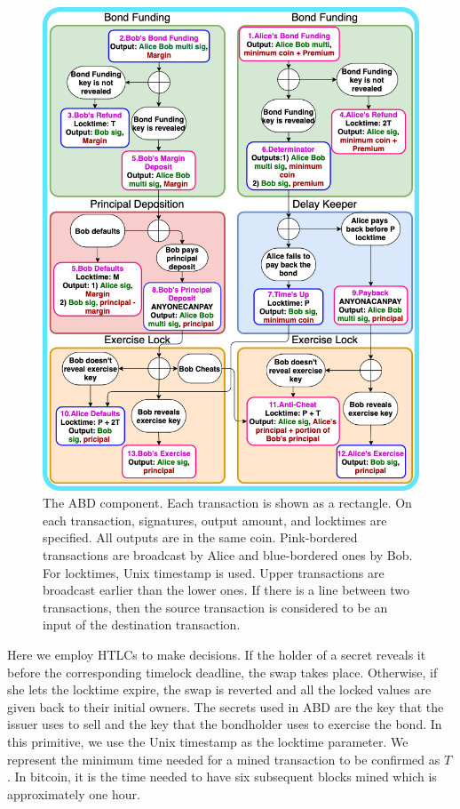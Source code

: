 \begin{figure}[h]
  \centering
  \includegraphics[width=\linewidth]{figures/bond-first.png}
  \caption{The ABD component. Each transaction is shown as a rectangle. On each transaction, signatures, output amount, and locktimes are specified. All outputs are in the same coin. Pink-bordered transactions are broadcast by Alice and blue-bordered ones by Bob. For locktimes, Unix timestamp is used. Upper transactions are broadcast earlier than the lower ones. If there is a line between two transactions, then the source transaction is considered to be an input of the destination transaction.}
  \label{fig:non-collat-bond-no-checkseq}
\end{figure}

Here we employ HTLCs to make decisions. If the holder of a secret reveals it before the corresponding timelock deadline, the swap takes place. Otherwise, if she lets the locktime expire, the swap is reverted and all the locked values are given back to their initial owners. The secrets used in ABD are the {\it \Aone} key that the issuer uses to sell and the {\it \keyone} key that the bondholder uses to exercise the bond. In this primitive, we use the Unix timestamp as the locktime parameter. We represent the minimum time needed for a mined transaction to be confirmed as $T$. In bitcoin, it is the time needed to have six subsequent blocks mined which is approximately one hour.


